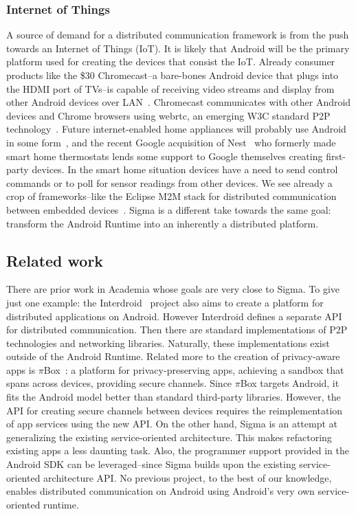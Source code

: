 \documentclass[prodmode]{acmlarge}
\begin{document}
\subsubsection{Internet of Things}
A source of demand for a distributed communication framework is from the push towards an Internet of Things (IoT). It is likely that Android will be the primary platform used for creating the devices that consist the IoT. Already consumer products like the \$30 Chromecast--a bare-bones Android device that plugs into the HDMI port of TVs--is capable of receiving video streams and display from other Android devices over LAN~\cite{chromecast}. Chromecast communicates with other Android devices and Chrome browsers using webrtc, an emerging W3C standard P2P technology~\cite{ChromecastWebrtc}. Future internet-enabled home appliances will probably use Android in some form~\cite{AndroidEverywhere}, and the recent Google acquisition of Nest~\cite{GoogleNest} who formerly made smart home thermostats lends some support to Google themselves creating first-party devices. In the smart home situation devices have a need to send control commands or to poll for sensor readings from other devices. We see already a crop of frameworks--like the Eclipse M2M stack for distributed communication between embedded devices~\cite{eclipse_m2m}. Sigma is a different take towards the same goal: transform the Android Runtime into an inherently a distributed platform.

\subsection{Related work}
There are prior work in Academia whose goals are very close to Sigma. To give just one example: the Interdroid~\cite{Interdroid} project also aims to create a platform for distributed applications on Android. However Interdroid defines a separate API for distributed communication. Then there are standard implementations of P2P technologies and networking libraries. Naturally, these implementations exist outside of the Android Runtime. Related more to the creation of privacy-aware apps is $\pi$Box~\cite{piBox}: a platform for privacy-preserving apps, achieving a sandbox that spans across devices, providing secure channels. Since $\pi$Box targets Android, it fits the Android model better than standard third-party libraries. However, the API for creating secure channels between devices requires the reimplementation of app services using the new API. On the other hand, Sigma is an attempt at generalizing the existing service-oriented architecture. This makes refactoring existing apps a less daunting task. Also, the programmer support provided in the Android SDK can be leveraged--since Sigma builds upon the existing service-oriented architecture API. No previous project, to the best of our knowledge, enables distributed communication on Android using Android's very own service-oriented runtime.
\end{document}
